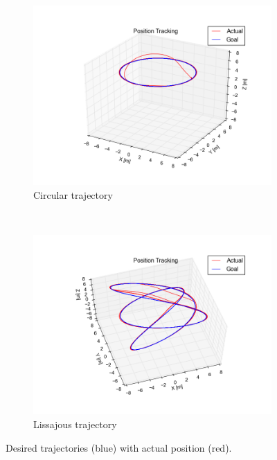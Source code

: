 \documentclass[paper=letter, fontsize=11pt]{scrartcl} %
\numberwithin{equation}{section} %
\numberwithin{figure}{section} %
\numberwithin{table}{section} %
\begin{document}
\begin{figure}[h]
  \centering
  \begin{subfigure}[b]{0.5\textwidth}
    \includegraphics[width=\textwidth]{circle_trajectory}
    \caption{Circular trajectory}
    \label{fig:circle_trajectory}
  \end{subfigure}%
  ~ %
  \begin{subfigure}[b]{0.5\textwidth}
    \includegraphics[width=\textwidth]{lissajous_trajectory}
    \caption{Lissajous trajectory}
    \label{fig:lissajous_trajectory}
  \end{subfigure}
  \caption{Desired trajectories (blue) with actual position (red).}
  \label{fig:trajectories}
\end{figure}
\end{document}
